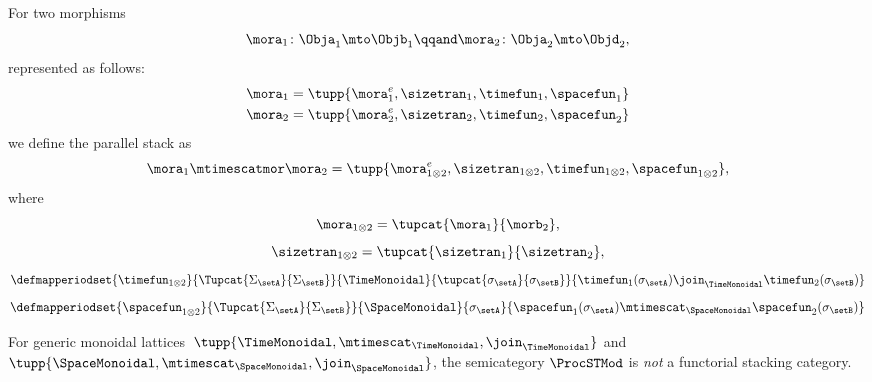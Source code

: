\begin{lemma}
    For two morphisms
    \begin{equation}
        \mora_1 \colon \Obja_1 \mto \Objb_1
        \qqand
        \mora_2 \colon \Obja_2 \mto \Objd_2,
    \end{equation}
    represented as follows:
    \begin{align}
        \mora_1 & = \tupp{\mora^e_1, \sizetran_1,  \timefun_1,
        \spacefun_{1}  } \\
        \mora_2 & = \tupp{\mora^e_2, \sizetran_2,  \timefun_2, \spacefun_{2} }
    \end{align}
    we define the parallel stack as
    \begin{equation}
        \mora_1 \mtimescatmor \mora_2 = \tupp{
        \mora^e_{1\otimes2},
        \sizetran_{1\otimes2},
        \timefun_{1\otimes2},
        \spacefun_{1\otimes2}
        },
    \end{equation}
    where
    \begin{equation}
        \mora_{1\otimes2} = \tupcat {\mora_1}  {\morb_2},
    \end{equation}
    \begin{equation}
        \sizetran_{1\otimes2} =  \tupcat {\sizetran_1}  {\sizetran_2},
    \end{equation}
    \begin{equation}
        \defmapperiodset{
            \timefun_{1\otimes 2}
        }{
            \Tupcat {\Sigma_{\setA}} {\Sigma_{\setB}}
        }{
            \TimeMonoidal
        }{
            \tupcat {\sigma_{\setA}} {\sigma_{\setB}}
        }{
            \timefun_1(\sigma_{\setA}) \join_{\TimeMonoidal} \timefun_2(\sigma_{\setB})
        }
    \end{equation}
    \begin{equation}
        \defmapperiodset{
            \spacefun_{1\otimes2}
        }{
            \Tupcat {\Sigma_{\setA}} {\Sigma_{\setB}}
        }{
            \SpaceMonoidal
        }{
            \sigma_{\setA}
        }{
            \spacefun_1(\sigma_{\setA}) \mtimescat_{\SpaceMonoidal} \spacefun_2(\sigma_{\setB})
        }
    \end{equation}
\end{lemma}

\begin{lemma}
    For generic monoidal lattices~$\tupp{\TimeMonoidal, \mtimescat_{\TimeMonoidal}, \join_{\TimeMonoidal}}$ and $\tupp{\SpaceMonoidal, \mtimescat_{\SpaceMonoidal}, \join_{\SpaceMonoidal}}$, the semicategory $\ProcSTMod$  is \emph{not} a functorial stacking category.
\end{lemma}

